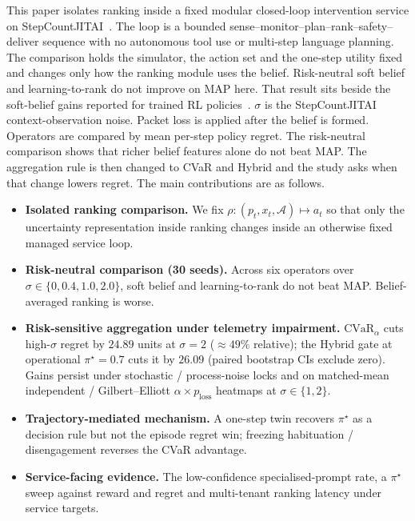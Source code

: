 \documentclass[journal]{IEEEtran}
\begin{document}
This paper isolates ranking inside a fixed modular closed-loop intervention service on StepCountJITAI~\cite{karine2024stepcount,towers2024gymnasium}.
The loop is a bounded sense--monitor--plan--rank--safety--deliver sequence with no autonomous tool use or multi-step language planning.
The comparison holds the simulator, the action set and the one-step utility fixed and changes only how the ranking module uses the belief. Risk-neutral soft belief and learning-to-rank do not improve on MAP here. That result sits beside the soft-belief gains reported for trained RL policies~\cite{karine2023uai}.
\(\sigma\) is the StepCountJITAI context-observation noise. Packet loss is applied after the belief is formed. Operators are compared by mean per-step policy regret.
The risk-neutral comparison shows that richer belief features alone do not beat MAP. The aggregation rule is then changed to CVaR and Hybrid and the study asks when that change lowers regret.
The main contributions are as follows.
\begin{itemize}
  \item \textbf{Isolated ranking comparison.} We fix \(\rho:(p_t,x_t,\mathcal{A})\mapsto a_t\) so that only the uncertainty representation inside ranking changes inside an otherwise fixed managed service loop.
  \item \textbf{Risk-neutral comparison (30 seeds).} Across six operators over \(\sigma\in\{0,0.4,1.0,2.0\}\), soft belief and learning-to-rank do not beat MAP. Belief-averaged ranking is worse.
  \item \textbf{Risk-sensitive aggregation under telemetry impairment.} \(\mathrm{CVaR}_\alpha\) cuts high-\(\sigma\) regret by \(24.89\) units at \(\sigma=2\) (\(\approx 49\%\) relative); the Hybrid gate at operational \(\pi^\star=0.7\) cuts it by \(26.09\) (paired bootstrap CIs exclude zero). Gains persist under stochastic / process-noise locks and on matched-mean independent / Gilbert--Elliott \(\alpha\times p_{\mathrm{loss}}\) heatmaps at \(\sigma\in\{1,2\}\).
  \item \textbf{Trajectory-mediated mechanism.} A one-step twin recovers \(\pi^\star\) as a decision rule but not the episode regret win; freezing habituation / disengagement reverses the CVaR advantage.
  \item \textbf{Service-facing evidence.} The low-confidence specialised-prompt rate, a \(\pi^\star\) sweep against reward and regret and multi-tenant ranking latency under service targets.
\end{itemize}
\end{document}
